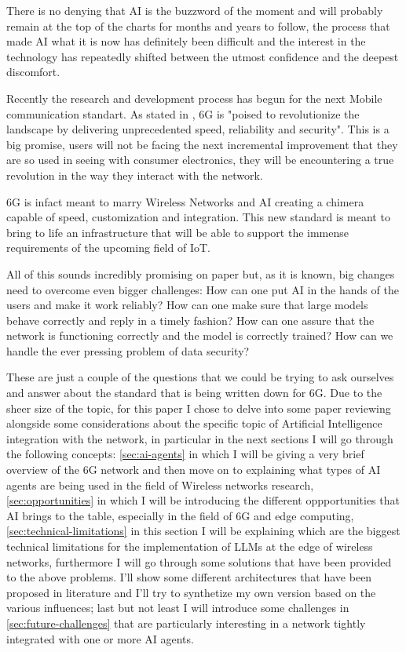 

There is no denying that AI is the buzzword of the moment and will probably remain at the top of the
charts for months and years to follow, the process that made AI what it is now has definitely been difficult
and the interest in the technology has repeatedly shifted between the utmost confidence and the deepest discomfort.

Recently the research and development process has begun for the next Mobile communication standart. 
As stated in \cite{6ainets}, 6G is "poised to revolutionize the landscape by delivering
unprecedented speed, reliability and security". This is a big promise, users will not be facing the
next incremental improvement that they are so used in seeing with consumer electronics, they will be
encountering a true revolution in the way they interact with the network.

6G is infact meant to marry Wireless Networks and AI creating a chimera capable of speed,
customization and integration. This new standard is meant to bring to life an infrastructure that
will be able to support the immense requirements of the upcoming field of IoT.

All of this sounds incredibly promising on paper but, as it is known, big changes need to overcome even
bigger challenges: How can one put AI in the hands of the users and make it work reliably? How can
one make sure that large models behave correctly and reply in a timely fashion? How can one
assure that the network is functioning correctly and the model is correctly trained? How can we
handle the ever pressing problem of data security?

These are just a couple of the questions that we could be trying to ask ourselves and answer about
the standard that is being written down for 6G. Due to the sheer size of the topic, for this
paper I chose to delve into some paper reviewing alongside some considerations about the specific
topic of Artificial Intelligence integration with the network, in particular in the next sections I
will go through the following concepts: \ref{sec:ai-agents} in which I will be giving a very brief
overview of the 6G network and then move on to explaining what types
of AI agents are being used in the field of Wireless networks research, \ref{sec:opportunities} in
which I will be introducing the different oppportunities that AI brings to the table, especially in
the field of 6G and edge computing, \ref{sec:technical-limitations} in this section I will be
explaining which are the biggest technical limitations for the implementation of LLMs at the edge of
wireless networks, furthermore I will go through some solutions that have been provided to the above
problems. I'll show some different architectures that have been proposed in literature and
I'll try to synthetize my own version based on the various influences; last but not least I will
introduce some challenges in \ref{sec:future-challenges} that are particularly interesting in a
network tightly integrated with one or more AI agents.
